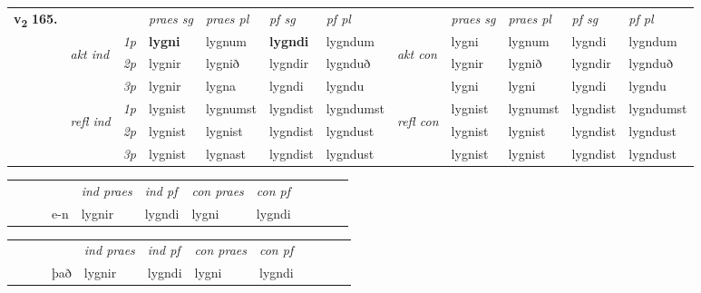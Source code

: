 \begin{tabular}{llllllllllll} \toprule
\multirow{4}{*}{{{\textbf{v{\textsubscript{2}}} \Large{\textbf{165.}}}}}  & &   &  \textit{praes sg}  & \textit{praes pl}  &\textit{ pf sg} & \textit{pf pl} &  &  \textit{praes sg}  & \textit{praes pl}  & \textit{pf sg} & \textit{pf pl } \\*
	\cmidrule{4-7} \cmidrule{9-12}
 & \multirow{3}{*}{\begin{turn}{90}\textit{akt ind}\end{turn}} & {\textit{1p}} & \textbf{lygni} & lygnum    & \textbf{lygndi} & lygndum & \multirow{3}{*}{\begin{turn}{90}\textit{akt con}\end{turn}} &lygni & lygnum & lygndi & lygndum\\*
& &  {\textit{2p}} &  lygnir  & lygnið   & lygndir & lygnduð & & lygnir & lygnið & lygndir & lygnduð \\*
& &  {\textit{3p}} & lygnir & lygna   & lygndi & lygndu & & lygni & lygni& lygndi & lygndu  \\*
\cmidrule{4-7} \cmidrule{9-12}
 &\multirow{3}{*}{\begin{turn}{90}\textit{refl ind}\end{turn}} & {\textit{1p}} & lygnist & lygnumst    & lygndist & lygndumst & \multirow{3}{*}{\begin{turn}{90}\textit{refl con}\end{turn}}  &lygnist & lygnumst & lygndist & lygndumst\\*
 &&  {\textit{2p}} &  lygnist  & lygnist   & lygndist & lygndust & &lygnist & lygnist & lygndist & lygndust \\*
& &  {\textit{3p}} & lygnist & lygnast   & lygndist & lygndust & & lygnist & lygnist& lygndist & lygndust  \\*
\cmidrule{4-7} \cmidrule{9-12}
\end{tabular}


\begin{tabular}{llllllllllll}
 & &  & &  \textit{ind praes} & \textit{ind pf} & \textit{con praes} & \textit{con pf} \\*
&  & & e-n & lygnir & lygndi & lygni & lygndi \\*
\cmidrule{5-9}
\end{tabular}


\begin{tabular}{llllllllllll}
 & &  & &  \textit{ind praes} & \textit{ind pf} & \textit{con praes} & \textit{con pf} \\*
&  & & það & lygnir & lygndi & lygni & lygndi \\*
\cmidrule{5-9}
\end{tabular}


